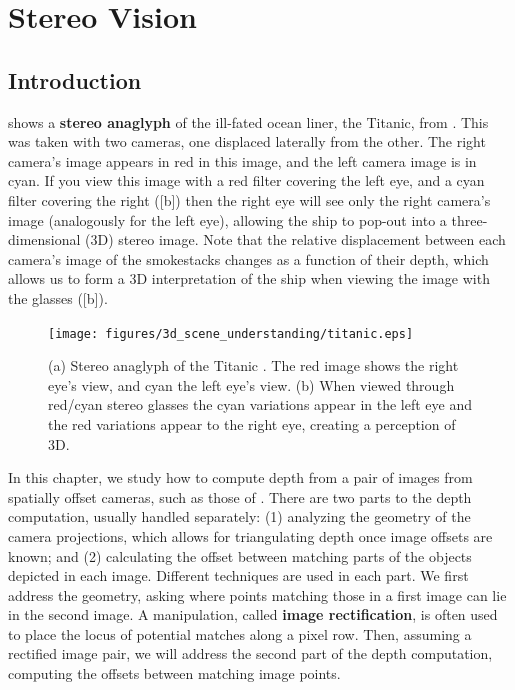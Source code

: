 \chapter{Stereo Vision}
\label{chap:stereo_vision}

\section{Introduction}

 shows a {\bf stereo anaglyph}
of the ill-fated ocean liner, the Titanic, from \cite{McManus2022}.  This was taken with two cameras, one displaced laterally from the other.  The right camera's image appears in red in this image, and the left camera image is in cyan.  If you view this image with a red filter covering the left eye, and a cyan filter covering the right (\fig{\ref{fig:titanic}}[b]) then the right eye will see only the right camera's image (analogously for the left eye), allowing the ship to pop-out into a three-dimensional (3D) stereo image.  Note that the relative displacement between each camera's image of the smokestacks changes as a function of their depth, which allows us to form a 3D interpretation of the ship when viewing the image with the glasses (\fig{\ref{fig:titanic}}[b]).

\begin{figure}[h]
\centerline{
\texttt{[image: figures/3d\_scene\_understanding/titanic.eps]}
}
\caption{(a) Stereo anaglyph of the Titanic \cite{McManus2022}.  The red image shows the right eye's view, and cyan the left eye's view.  (b) When viewed through red/cyan stereo glasses the cyan variations appear in the left eye and the red variations appear to the right eye, creating a perception of 3D.}
\label{fig:titanic}
\end{figure}


 In this chapter, we study how to compute depth from a pair of images from spatially offset cameras, such as those of \fig{\ref{fig:titanic}}.  There are two parts to the depth computation, usually handled separately:  (1) analyzing the geometry of the camera projections, which allows for triangulating depth once image offsets are known; and (2) calculating the offset between matching parts of the objects depicted in each image.  Different techniques are used in each part.  We first address the geometry, asking where points matching those in a first image can lie in the second image. A manipulation, called {\bf image rectification}, is often used to place the locus of potential matches along a pixel row.  Then, assuming a rectified image pair, we will address the second part of the depth computation, computing the offsets between matching image points.



